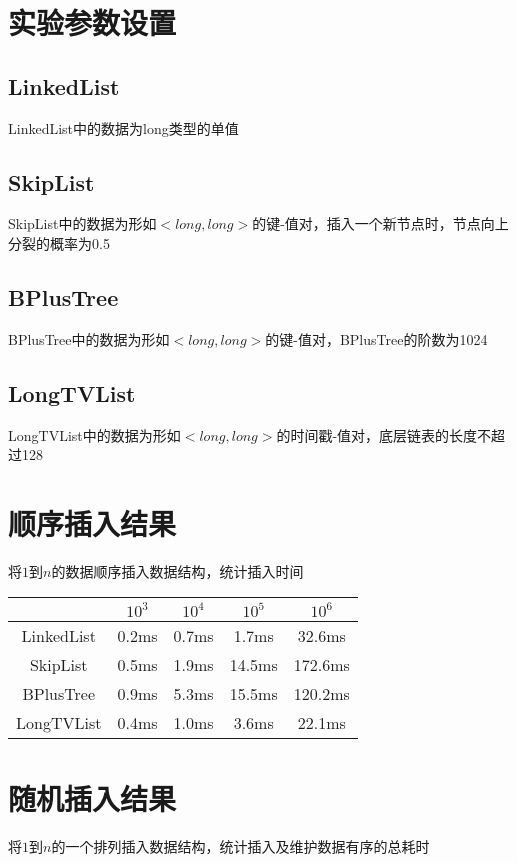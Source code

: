 \documentclass[UTF8]{article}
\begin{document}
\section{实验参数设置}
\subsection{LinkedList}
LinkedList中的数据为long类型的单值

\subsection{SkipList}
SkipList中的数据为形如$<long, long>$的键-值对，插入一个新节点时，节点向上分裂的概率为0.5

\subsection{BPlusTree}
BPlusTree中的数据为形如$<long, long>$的键-值对，BPlusTree的阶数为1024

\subsection{LongTVList}
LongTVList中的数据为形如$<long, long>$的时间戳-值对，底层链表的长度不超过128

\section{顺序插入结果}
将$1$到$n$的数据顺序插入数据结构，统计插入时间

\begin{tabular}{|c|c|c|c|c|}

    \hline
     & $10^3$ & $10^4$ & $10^5$ & $10^6$ \\
    \hline
    LinkedList & 0.2ms & 0.7ms & 1.7ms & 32.6ms\\
    \hline
    SkipList & 0.5ms & 1.9ms & 14.5ms & 172.6ms\\
    \hline
    BPlusTree & 0.9ms & 5.3ms & 15.5ms & 120.2ms\\
    \hline
    LongTVList & 0.4ms & 1.0ms & 3.6ms & 22.1ms\\
    \hline

\end{tabular}

\section{随机插入结果}
将$1$到$n$的一个排列插入数据结构，统计插入及维护数据有序的总耗时
\end{document}
